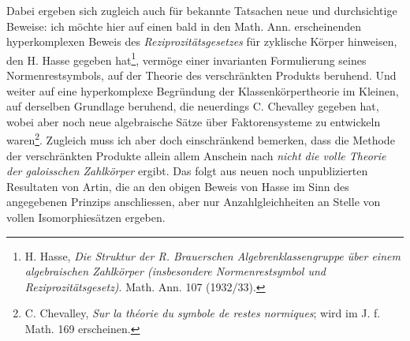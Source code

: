 Dabei ergeben sich zugleich auch für bekannte Tatsachen neue und durchsichtige Beweise: ich möchte hier auf einen bald in den Math. Ann. erscheinenden hyperkomplexen Beweis des \emph{Reziprozitätsgesetzes} für zyklische Körper hinweisen, den H. Hasse gegeben hat\footnote{H. Hasse, \emph{Die Struktur der R. Brauerschen Algebrenklassengruppe über einem algebraischen Zahlkörper (insbesondere Normenrestsymbol und Reziprozitätsgesetz)}. Math. Ann. 107 (1932/33).}, vermöge einer invarianten Formulierung seines Normenrestsymbols, auf der Theorie des verschränkten Produkts beruhend. Und weiter auf eine hyperkomplexe Begründung der Klassenkörpertheorie im Kleinen, auf derselben Grundlage beruhend, die neuerdings C. Chevalley gegeben hat, wobei aber noch neue algebraische Sätze über Faktorensysteme zu entwickeln waren\footnote{C. Chevalley, \emph{Sur la théorie du symbole de restes normiques}; wird im J. f. Math. 169 erscheinen.}. Zugleich muss ich aber doch einschränkend bemerken, dass die Methode der verschränkten Produkte allein allem Anschein nach \emph{nicht die volle Theorie der galoisschen Zahlkörper} ergibt. Das folgt aus neuen noch unpublizierten Resultaten von Artin, die an den obigen Beweis von Hasse im Sinn des angegebenen Prinzips anschliessen, aber nur Anzahlgleichheiten an Stelle von vollen Isomorphiesätzen ergeben.

